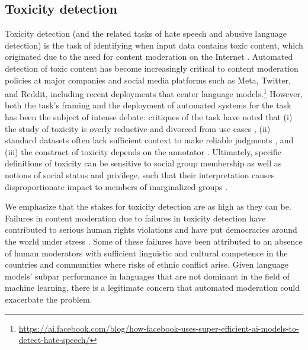 \hypertarget{toxicity-detection}{\subsection{Toxicity detection}}
\label{sec:toxicity-detection}

Toxicity detection (and the related tasks of hate speech and abusive language detection) is the task of identifying when input data contains toxic content, which originated due to the need for content moderation on the Internet \citep{schmidt2017survey, rauh2022characteristics}.
Automated detection of toxic content has become increasingly critical to content moderation policies at major companies and social media platforms such as Meta, Twitter, and Reddit, including recent deployments that center language models.\footnote{\url{https://ai.facebook.com/blog/how-facebook-uses-super-efficient-ai-models-to-detect-hate-speech/}}
However, both the task's framing and the deployment of automated systems for the task has been the subject of intense debate: critiques of the task have noted that 
(i) the study of toxicity is overly reductive and divorced from use cases \citep{diaz2022accounting}, 
(ii) standard datasets often lack sufficient context to make reliable judgments \citep{pavlopoulos2020toxicity, hovy2021importance},  
and (iii) the construct of toxicity depends on the annotator \citep{sap2019risk, gordon2022jury}.
Ultimately, specific definitions of toxicity can be sensitive to social group membership as well as notions of social status and privilege, such that their interpretation causes disproportionate impact to  members of marginalized groups \citep{welbl2021challenges}.

We emphasize that the stakes for toxicity detection are as high as they can be. Failures in content moderation due to failures in toxicity detection have contributed to serious human rights violations \citep[such as the Rohingya genocide in Myanmar;][]{stecklow2018report,BSR2018HRIA,OHCHR2018report} and have put democracies around the world under stress \citep{persily_tucker_2020}. Some of these failures have been attributed to an absence of human moderators with sufficient linguistic and cultural competence in the countries and communities where risks of ethnic conflict arise. Given language models’ subpar performance in languages that are not dominant in the field of machine learning, there is a legitimate concern that automated moderation could exacerbate the problem. 


